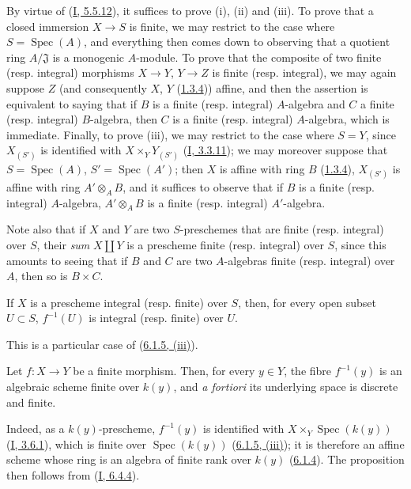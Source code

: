 
By virtue of (\hyperref[I.5.5.12]{I, 5.5.12}), it suffices to prove (i),
(ii) and (iii). To prove that a closed immersion $X\to S$ is finite, we may
restrict to the case where $S=\operatorname{Spec}(A)$, and everything then
comes down to observing that a quotient ring $A/\mathfrak{J}$ is a monogenic
$A$-module. To prove that the composite of two finite (resp. integral)
morphisms $X\to Y$, $Y\to Z$ is finite (resp. integral), we may again suppose
$Z$ (and consequently $X$, $Y$ (\hyperref[II.1.3.4]{1.3.4})) affine, and
then the assertion is equivalent to saying that if $B$ is a finite (resp.
integral) $A$-algebra and $C$ a finite (resp. integral) $B$-algebra, then
$C$ is a finite (resp. integral) $A$-algebra, which is immediate. Finally, to
prove (iii), we may restrict to the case where $S=Y$, since $X_{(S')}$ is
identified with $X\times_Y Y_{(S')}$ (\hyperref[I.3.3.11]{I, 3.3.11}); we
may moreover suppose that $S=\operatorname{Spec}(A)$,
$S'=\operatorname{Spec}(A')$; then $X$ is affine with ring $B$
(\hyperref[II.1.3.4]{1.3.4}), $X_{(S')}$ is affine with ring
$A'\otimes_A B$, and it suffices to observe that if $B$ is a finite (resp.
integral) $A$-algebra, $A'\otimes_A B$ is a finite (resp. integral)
$A'$-algebra.

Note also that if $X$ and $Y$ are two $S$-preschemes that are finite (resp.
integral) over $S$, their \emph{sum} $X\amalg Y$ is a prescheme finite
(resp. integral) over $S$, since this amounts to seeing that if $B$ and $C$
are two $A$-algebras finite (resp. integral) over $A$, then so is
$B\times C$.

\begin{corollary}[6.1.6]
\label{II.6.1.6}
If $X$ is a prescheme integral (resp. finite) over $S$, then, for every open
subset $U\subset S$, $f^{-1}(U)$ is integral (resp. finite) over $U$.
\end{corollary}

This is a particular case of (\hyperref[II.6.1.5]{6.1.5, (iii)}).

\begin{corollary}[6.1.7]
\label{II.6.1.7}
Let $f:X\to Y$ be a finite morphism. Then, for every $y\in Y$, the fibre
$f^{-1}(y)$ is an algebraic scheme finite over $k(y)$, and \emph{a fortiori}
its underlying space is discrete and finite.
\end{corollary}

Indeed, as a $k(y)$-prescheme, $f^{-1}(y)$ is identified with
$X\times_Y\operatorname{Spec}(k(y))$ (\hyperref[I.3.6.1]{I, 3.6.1}), which
is finite over $\operatorname{Spec}(k(y))$
(\hyperref[II.6.1.5]{6.1.5, (iii)}); it is therefore an affine scheme
whose ring is an algebra of finite rank over $k(y)$
(\hyperref[II.6.1.4]{6.1.4}). The proposition then follows from
(\hyperref[I.6.4.4]{I, 6.4.4}).

